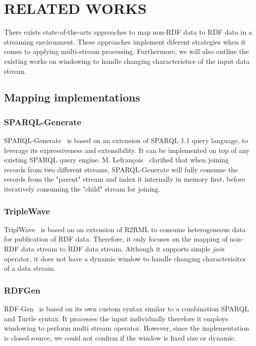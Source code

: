 \section{RELATED WORKS} 
\label{sec:RELATED WORKS} 
There exists state-of-the-arts approaches to map non-RDF data 
to RDF data in a streaming environment. These approaches 
implement diferent strategies when it comes to applying 
multi-stream processing. Furthermore, we will also outline
the existing works on windowing to handle changing characteristics 
of the input data stream. 

\subsection{Mapping implementations}
\subsubsection{SPARQL-Generate} 
SPARQL-Generate~\cite{sparql_generate} 
is based on an extension of SPARQL 1.1 query language, to leverage 
its expressiveness and extensibility. 
It can be implemented on top 
of any existing SPARQL query engine. 
M. Lefran\c{c}ois~\cite{sparql_generate} clarified that when joining
records from two different streams, SPARQL-Generate will fully consume the records 
from the "parent" stream and index it internally in memory first, before 
iteratively consuming the "child" stream for joining. 

\subsubsection{TripleWave} 
TriplWave~\cite{triple_wave}  is based on an extension of 
R2RML to consume heterogeneous data for publication of RDF data. 
Therefore, it only focuses on the mapping of non-RDF data stream to RDF data stream. 
Although it supports simple \emph{join} operator, it does not have a 
dynamic window to handle changing characterisitcs of a data stream.

\subsubsection{RDFGen}
RDF-Gen~\cite{rdf_gen} is based on its own custom syntax 
similar to a combination SPARQL and Turtle syntax. It processes the input 
individually therefore it employs windowing to perform multi stream operator. 
However, since the implementation is closed source, we could not confirm if 
the window is fixed size or dynamic. 


